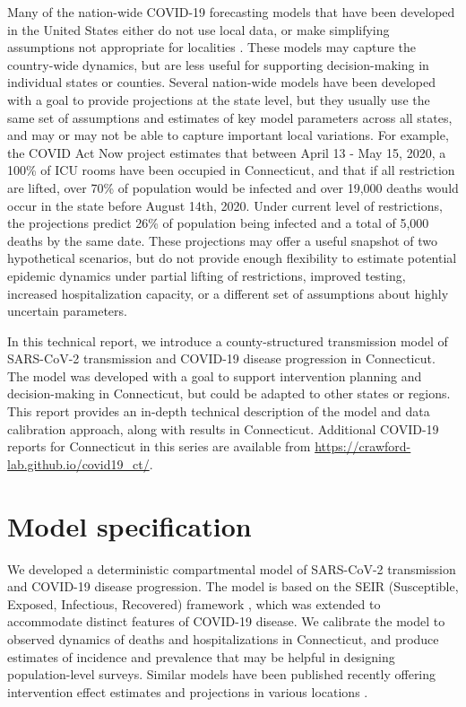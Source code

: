 \documentclass[11pt]{article}
\begin{document}
Many of the nation-wide COVID-19 forecasting models that have been developed in the United States either do not use local data, or make simplifying assumptions not appropriate for localities \citep{cdc2020covid19forecasts}. These models may capture the country-wide dynamics, but are less useful for supporting decision-making in individual states or counties. Several nation-wide models have been developed with a goal to provide projections at the state level, but they usually use the same set of assumptions and estimates of key model parameters across all states, and may or may not be able to capture important local variations. For example, the COVID Act Now project \citep{covidactnow2020you} estimates that between April 13 - May 15, 2020, a 100\% of ICU rooms have been occupied in Connecticut, and that if all restriction are lifted, over 70\% of population would be infected and over 19,000 deaths would occur in the state before August 14th, 2020. Under current level of restrictions, the projections predict 26\% of population being infected and a total of 5,000 deaths by the same date. These projections may offer a useful snapshot of two hypothetical scenarios, but do not provide enough flexibility to estimate potential epidemic dynamics under partial lifting of restrictions, improved testing, increased hospitalization capacity, or a different set of assumptions about highly uncertain parameters.  

In this technical report, we introduce a county-structured transmission model of SARS-CoV-2 transmission and COVID-19 disease progression in Connecticut.  The model was developed with a goal to support intervention planning and decision-making in Connecticut, but could be adapted to other states or regions.  This report provides an in-depth technical description of the model and data calibration approach, along with results in Connecticut.  Additional COVID-19 reports for Connecticut in this series are available from \url{https://crawford-lab.github.io/covid19_ct/}. 


\section{Model specification}

We developed a deterministic compartmental model of SARS-CoV-2 transmission and COVID-19 disease progression.
The model is based on the SEIR (Susceptible, Exposed, Infectious, Recovered) framework \citep{keeling2011modeling}, which was extended to accommodate distinct features of COVID-19 disease. We calibrate the model to observed dynamics of deaths and hospitalizations in Connecticut, and produce estimates of incidence and prevalence that may be helpful in designing population-level surveys. Similar models have been published recently offering intervention effect estimates and projections in various locations \citep{cdc2020covid19forecasts, li2020substantial, kissler2020projecting, childs2020impact, salje2020estimating, salomon2020defining}.
\end{document}
